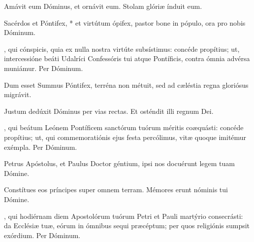 \documentclass[fontsize=9pt,paper=A6,twoside,BCOR=1mm,DIV=22,headinclude]{scrarticle}
\renewcommand\A{\Ant}
\begin{document}
\begin{multicols}{2}

{






}



{
\V Amávit eum Dóminus, et ornávit eum.
\R Stolam glóriæ índuit eum.

 Sacérdos et Póntifex, * et virtútum ópifex, pastor bone in pópulo, ora pro nobis Dóminum.

, qui cónspicis, quia ex nulla nostra virtúte subsístimus: concéde propítius; ut, intercessióne beáti Udalríci Confessóris tui atque Pontíficis, contra ómnia advérsa muniámur. Per Dóminum.

}


\A Dum esset Summus Póntifex, terréna non métuit, sed ad cæléstia regna gloriósus migrávit.

\V Justum dedúxit Dóminus per vias rectas.
\R Et osténdit illi regnum Dei.

, qui beátum Leónem Pontíficem sanctórum tuórum méritis coæquásti: concéde propítius; ut, qui commemoratiónis ejus festa percólimus, vitæ quoque imitémur exémpla. \red{(}Per Dóminum.\red{)}


\A Petrus Apóstolus, et Paulus Doctor géntium, ipsi nos docuérunt legem tuam Dómine.

\V Constítues eos príncipes super omnem terram.
\R Mémores erunt nóminis tui Dómine.

, qui hodiérnam diem Apostolórum tuórum Petri et Pauli martýrio consecrásti: da Ecclésiæ tuæ, eórum in ómnibus sequi præcéptum; per quos religiónis sumpsit exórdium. Per Dóminum.


\end{multicols}
\end{document}
